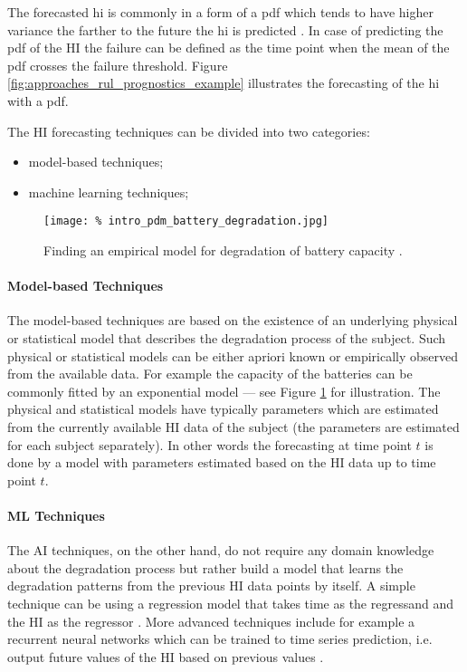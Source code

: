 The forecasted \acrshort{hi} is commonly in a form of a \acrfull{pdf} which tends to have higher variance the farther to the future the \acrshort{hi} is predicted \cite{saxena2010metrics}.
In case of predicting the \gls{pdf} of the HI the failure can be defined as the time point when the mean of the \acrshort{pdf} crosses the failure threshold.
Figure \ref{fig:approaches_rul_prognostics_example} illustrates the forecasting of the \acrshort{hi} with a \acrshort{pdf}.

The HI forecasting techniques can be divided into two categories:
\begin{itemize}
    \item model-based techniques;
    \item machine learning techniques;
\end{itemize}

\begin{figure}
    \centering
    \texttt{[image: \%
        intro\_pdm\_battery\_degradation.jpg]}
    \caption{Finding an empirical model for degradation of battery capacity 
             \cite{miao2013remaining}.}
    \label{fig:approaches_rul_battery}
\end{figure}

\paragraph{Model-based Techniques}
The model-based techniques are based on the existence of an underlying physical or statistical model that describes the degradation process of the subject.
Such physical or statistical models can be either apriori known or empirically observed from the available data.
For example the capacity of the batteries can be commonly fitted by an exponential model \cite{he2011prognostics} --- see Figure \ref{fig:approaches_rul_battery} for illustration.
The physical and statistical models have typically parameters which are estimated from the currently available HI data of the subject (the parameters are estimated for each subject separately).
In other words the forecasting at time point $t$ is done by a model with parameters estimated based on the HI data up to time point $t$.

\paragraph{ML Techniques}
The AI techniques, on the other hand, do not require any domain knowledge about the degradation process but rather build a model that learns the degradation patterns from the previous HI data points by itself.
A simple technique can be using a regression model that takes time as the regressand and the HI as the regressor \cite{yoo2018novel}.
More advanced techniques include for example a recurrent neural networks which can be trained to time series prediction, i.e. output future values of the HI based on previous values \cite{zhang2018long}.

